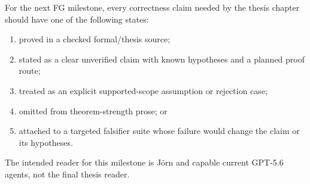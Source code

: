 \begin{remark}\label{rem:flow-graph-truth-surface-success}
For the next FG milestone, every correctness claim needed by the thesis chapter
should have one of the following states:
\begin{enumerate}
  \item proved in a checked formal/thesis source;
  \item stated as a clear unverified claim with known hypotheses and a planned
    proof route;
  \item treated as an explicit supported-scope assumption or rejection case;
  \item omitted from theorem-strength prose; or
  \item attached to a targeted falsifier suite whose failure would change the
    claim or its hypotheses.
\end{enumerate}
The intended reader for this milestone is Jörn and capable current GPT-5.6
agents, not the final thesis reader.
\end{remark}

